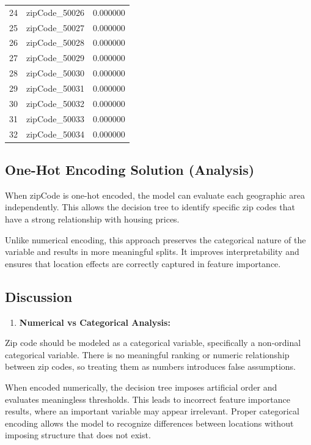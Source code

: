 \documentclass[
  letterpaper,
  DIV=11,
  numbers=noendperiod]{scrartcl}
\providecommand{\tightlist}{%
  \setlength{\itemsep}{0pt}\setlength{\parskip}{0pt}}
\begin{document}
\begin{longtable}[]{@{}lll@{}}
24 & zipCode\_50026 & 0.000000 \\
25 & zipCode\_50027 & 0.000000 \\
26 & zipCode\_50028 & 0.000000 \\
27 & zipCode\_50029 & 0.000000 \\
28 & zipCode\_50030 & 0.000000 \\
29 & zipCode\_50031 & 0.000000 \\
30 & zipCode\_50032 & 0.000000 \\
31 & zipCode\_50033 & 0.000000 \\
32 & zipCode\_50034 & 0.000000 \\
\end{longtable}

\subsection{One-Hot Encoding Solution
(Analysis)}\label{one-hot-encoding-solution-analysis}

When zipCode is one-hot encoded, the model can evaluate each geographic
area independently. This allows the decision tree to identify specific
zip codes that have a strong relationship with housing prices.

Unlike numerical encoding, this approach preserves the categorical
nature of the variable and results in more meaningful splits. It
improves interpretability and ensures that location effects are
correctly captured in feature importance.

\subsection{Discussion}\label{discussion}

\begin{enumerate}
\def\labelenumi{\arabic{enumi}.}
\tightlist
\item
  \textbf{Numerical vs Categorical Analysis:}
\end{enumerate}

Zip code should be modeled as a categorical variable, specifically a
non-ordinal categorical variable. There is no meaningful ranking or
numeric relationship between zip codes, so treating them as numbers
introduces false assumptions.

When encoded numerically, the decision tree imposes artificial order and
evaluates meaningless thresholds. This leads to incorrect feature
importance results, where an important variable may appear irrelevant.
Proper categorical encoding allows the model to recognize differences
between locations without imposing structure that does not exist.
\end{document}
